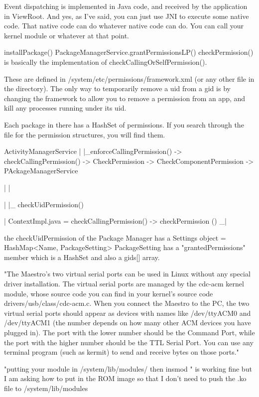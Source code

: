 \documentclass{book}
\begin{document}
\begin{CJK}{UTF8}{gbsn}
Event dispatching is implemented in Java code, and received by the application in ViewRoot.  And yes, as I've said, you can just use JNI to execute some native code.  That native code can do whatever native code can do.  You can call your kernel module or whatever at that point.


installPackage()
PackageManagerService.grantPermissionsLP()
checkPermission() is basically the implementation of checkCallingOrSelfPermission().

These are defined in /system/etc/permissions/framework.xml (or any other file in the directory).
The only way to temporarily remove a uid from a gid is by changing the framework to allow you to remove a permission from an app, and kill any processes running under its uid.

Each package in there has a HashSet of permissions.  If you search through the file for the permission structures, you will find them.


ActivityManagerService
|
|_enforceCallingPermission() -> checkCallingPermission() ->
CheckPermission -> CheckComponentPermission -> PAckageManagerService
 
|                                                                 |
 
|                                                                 |_
checkUidPermission()
 
|
ContextImpl.java = checkCallingPermission() -> checkPermission () _|

the checkUidPermission of the Package Manager has a Settings object =
HashMap<Name, PackageSetting>
PackageSetting has a "grantedPermissions" member which is a HashSet
and also a gids[] array.



"The Maestro’s two virtual serial ports can be used in Linux without
any special driver installation. The virtual serial ports are managed
by the cdc-acm kernel module, whose source code you can find in your
kernel’s source code drivers/usb/class/cdc-acm.c. When you connect the
Maestro to the PC, the two virtual serial ports should appear as
devices with names like /dev/ttyACM0 and /dev/ttyACM1 (the number
depends on how many other ACM devices you have plugged in). The port
with the lower number should be the Command Port, while the port with
the higher number should be the TTL Serial Port. You can use any
terminal program (such as kermit) to send and receive bytes on those
ports."


"putting your module in /system/lib/modules/ then insmod " is working fine but I am asking how to put in the ROM image so that I don't need to push the .ko file to /system/lib/modules


\end{CJK}
\end{document}
